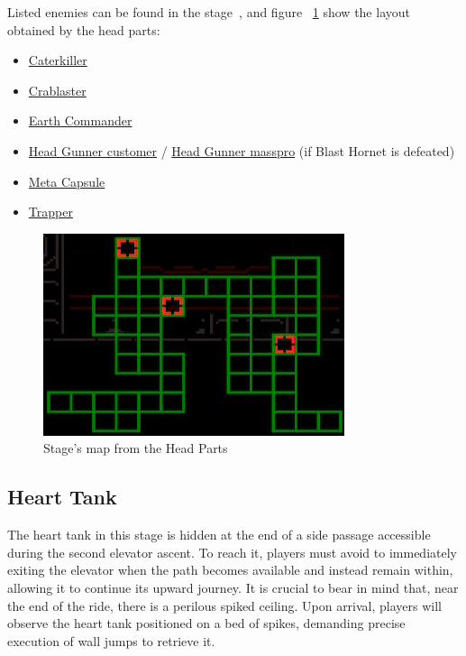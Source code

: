 Listed enemies can be found in the stage~\cite{wiki:Power_control}, and figure ~\ref{fig:Power_control_map} show the layout obtained by the head parts:
\begin{itemize}
	\item \hyperlink{enem:Caterkiller}{Caterkiller}
	\item \hyperlink{enem:Crablaster}{Crablaster}
	\item \hyperlink{enem:Earth_Commander}{Earth Commander}
	\item \hyperlink{enem:Head_Gunner_customer}{Head Gunner customer} / \hyperlink{enem:Head_Gunner_masspro}{Head Gunner masspro} (if Blast Hornet is defeated) 
	\item \hyperlink{enem:Meta_Capsule}{Meta Capsule}
	\item \hyperlink{enem:Trapper}{Trapper}
\end{itemize}

\begin{figure}[htp]
	\centering
	\includegraphics[width=.5\linewidth]{figures/X3/Volt_catfish/map.jpg}
	\caption{Stage's map from the Head Parts}
	\label{fig:Power_control_map}
\end{figure}

\subsection{Heart Tank}
The heart tank in this stage is hidden at the end of a side passage accessible during the second elevator ascent. To reach it, players must avoid to immediately exiting the elevator when the path becomes available and instead remain within, allowing it to continue its upward journey. It is crucial to bear in mind that, near the end of the ride, there is a perilous spiked ceiling. Upon arrival, players will observe the heart tank positioned on a bed of spikes, demanding precise execution of wall jumps to retrieve it.

